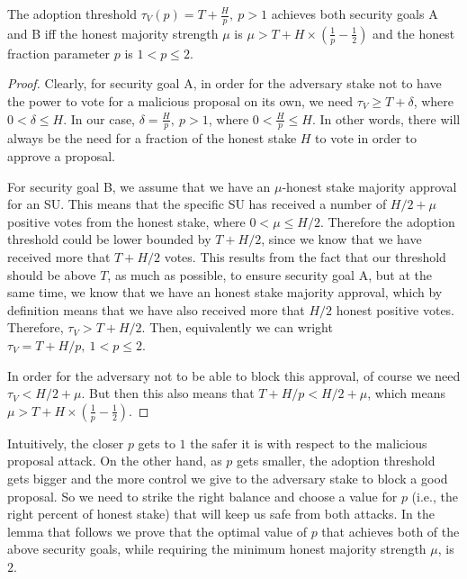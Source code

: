 \begin{theorem} \label{theorem-adopthresh}
The adoption threshold $\tau_V(p) = T + \frac{H}{p},\ p > 1$ achieves both security goals A and B iff the honest majority strength $\mu$ is $\mu > T + H \times (\frac{1}{p} - \frac{1}{2})$ and the honest fraction parameter $p$ is $1 < p \leq 2$.
\end{theorem}
\begin{proof}
Clearly, for security goal A, in order for the adversary stake not to have the power to vote for a malicious proposal on its own, we need $\tau_V \geq T + \delta$,
where $0 < \delta \leq H$. In our case, $\delta = \frac{H}{p},\ p > 1$, where $0 < \frac{H}{p} \leq H$. In other words, there will always be the need for a fraction of the honest stake $H$ to vote in order to approve a proposal.

For security goal B, we assume that we have an $\mu$-honest stake majority approval for an SU. This means that the specific SU has received a number of $H/2 + \mu$ positive votes from the honest stake, where $0 < \mu \leq H/2$.
Therefore the adoption threshold could be lower bounded by $T + H/2$, since we know that we have received more that $T + H/2$ votes. This results from the fact that our threshold should be above $T$, as much as possible, to ensure security goal A, but at the same time, we know that we have an honest stake majority approval, which by definition means that we have also received more that $H/2$ honest positive votes. Therefore,  $\tau_V > T + H/2$. Then, equivalently we can wright $\tau_V = T + H/p ,\ 1 < p \leq 2$.

In order for the adversary not to be able to block this approval, of course we need $\tau_V < H/2 + \mu$. But then this also means that $T + H/p < H/2 + \mu$, which means $\mu > T + H \times (\frac{1}{p} - \frac{1}{2})$.
\end{proof}

Intuitively, the closer $p$ gets to $1$ the safer it is with respect to the malicious proposal attack. On the other hand, as $p$ gets smaller, the adoption threshold gets bigger and the more control we give to the adversary stake to block a good proposal. So we need to strike the right balance and choose a value for $p$ (i.e., the right percent of honest stake) that will keep us safe from both attacks. In the lemma that follows we prove that the optimal value of $p$ that achieves both of the above security goals, while requiring the minimum honest majority strength $\mu$, is $2$.

